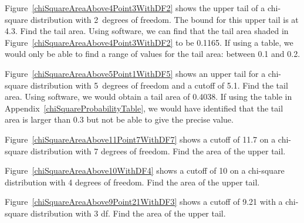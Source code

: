 \begin{examplewrap}
\begin{nexample}{Figure~\ref{chiSquareAreaAbove4Point3WithDF2}
    shows the upper tail of a chi-square distribution with
    2~degrees of freedom.
    The bound for this upper tail is at 4.3.
    Find the tail area.}
  Using software, we can find that the tail area shaded in
  Figure~\ref{chiSquareAreaAbove4Point3WithDF2}
  to be 0.1165.
  If using a table, we would only be able to find
  a range of values for the tail area:
  between 0.1 and 0.2.
\end{nexample}
\end{examplewrap}

\begin{examplewrap}
\begin{nexample}{Figure~\ref{chiSquareAreaAbove5Point1WithDF5}
    shows an upper tail for a chi-square distribution with
    5~degrees of freedom and a cutoff of 5.1.
    Find the tail area.}
  Using software, we would obtain a tail area of 0.4038.
  If using the table in Appendix~\ref{chiSquareProbabilityTable},
  we would have identified that the tail area is larger than 0.3
  but not be able to give the precise value.
\end{nexample}
\end{examplewrap}

\begin{exercisewrap}
\begin{nexercise}
Figure~\ref{chiSquareAreaAbove11Point7WithDF7} shows a cutoff
of 11.7 on a chi-square distribution with 7 degrees of freedom.
Find the area of the upper tail.\footnotemark{}
\end{nexercise}
\end{exercisewrap}

\begin{exercisewrap}
\begin{nexercise}
Figure~\ref{chiSquareAreaAbove10WithDF4} shows a cutoff
of 10 on a chi-square distribution with 4 degrees of freedom.
Find the area of the upper tail.\footnotemark{}
\end{nexercise}
\end{exercisewrap}

\begin{exercisewrap}
\begin{nexercise}
Figure~\ref{chiSquareAreaAbove9Point21WithDF3} shows a cutoff
of 9.21 with a chi-square distribution with 3 df.
Find the area of the upper tail.\footnotemark{}
\end{nexercise}
\end{exercisewrap}


